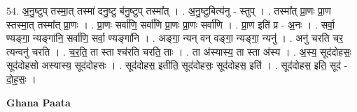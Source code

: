 \documentclass[17pt]{extarticle}
\begin{document}
54. अ॒नु॒ष्टुप् तस्मा॒त् तस्मा॑ दनु॒ष्टु ब॑नु॒ष्टुप् तस्मा᳚त् । . अ॒नु॒ष्टुबित्य॑नु - स्तुप् । . तस्मा᳚त् प्रा॒णः प्रा॒ण स्तस्मा॒त् तस्मा᳚त् प्रा॒णः । . प्रा॒णः सर्वा॑णि॒ सर्वा॑णि प्रा॒णः प्रा॒णः सर्वा॑णि । . प्रा॒ण इति॑ प्र - अ॒नः । . सर्वा॒ ण्यङ्गा॒ न्यङ्गा॑नि॒ सर्वा॑णि॒ सर्वा॒ ण्यङ्गा॑नि । . अङ्गा॒ न्यन् वन् वङ्गा॒ न्यङ्गा॒ न्यनु॑ । . अनु॑ चरति चर॒ त्यन्वनु॑ चरति । . च॒र॒ति॒ ता स्ता श्च॑रति चरति॒ ताः । . ता अ॑स्यास्य॒ ता स्ता अ॑स्य । . अ॒स्य॒ सूद॑दोहसः॒ सूद॑दोहसो अस्यास्य॒ सूद॑दोहसः । . सूद॑दोहस॒ इतीति॒ सूद॑दोहसः॒ सूद॑दोहस॒ इति॑ । . सूद॑दोहस॒ इति॒ सूद॑ - दो॒ह॒सः॒ । \newline

\textbf{Ghana Paata } \newline
\end{document}
